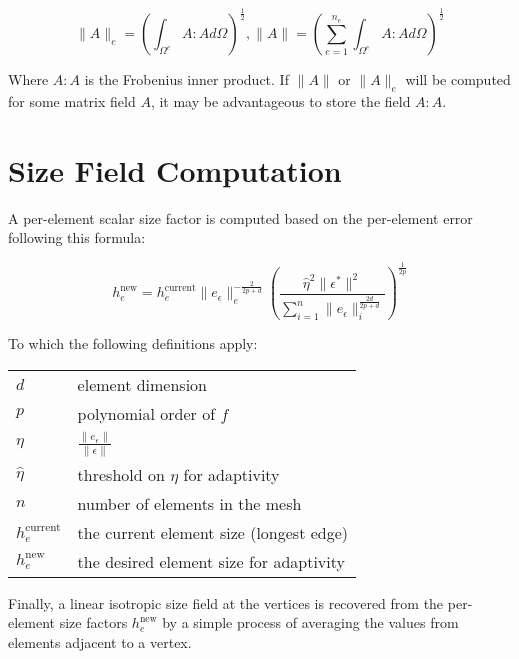 \documentclass{article}
\begin{document}
\[\|A\|_e=
\left(
\int_{\Omega^e} A : A d\Omega
\right)^\frac12,
\|A\|=
\left(
\sum_{e=1}^{n_e}
\int_{\Omega^e} A : A d\Omega
\right)^\frac12\]

Where $A:A$ is the Frobenius inner product.
If $\|A\|$ or $\|A\|_e$ will be computed for
some matrix field $A$, it may be advantageous
to store the field $A:A$.

\section{Size Field Computation}

A per-element scalar size factor is computed based on
the per-element error following this formula:

\[h^\text{new}_e = h^\text{current}_e
\|e_\epsilon\|^{-\frac{2}{2p+d}}_e
\left(
\frac
{\hat{\eta}^2\|\epsilon^*\|^2}
{\sum_{i=1}^n\|e_\epsilon\|^\frac{2d}{2p+d}_i}
\right)^\frac{1}{2p}
\]

To which the following definitions apply:

\begin{center}
\begin{tabular}{ll}
$d$ & element dimension \\
$p$ & polynomial order of $f$ \\
$\eta$ & $\frac{\|e_\epsilon\|}{\|\epsilon\|}$ \\
$\hat{\eta}$ & threshold on $\eta$ for adaptivity \\
$n$ & number of elements in the mesh \\
$h_e^\text{current}$ & the current element size (longest edge) \\
$h_e^\text{new}$ & the desired element size for adaptivity \\
\end{tabular}
\end{center}

Finally, a linear isotropic size field at
the vertices is recovered from the per-element
size factors $h_e^\text{new}$ by a simple
process of averaging the values from elements
adjacent to a vertex.
\end{document}
